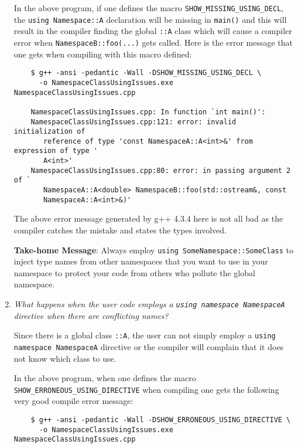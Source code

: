 \begin{enumerate}
In the above program, if one defines the macro
{}\texttt{SHOW\-\_MISSING\-\_USING\-\_DECL}, the {}\texttt{using
Namespace::A} declaration will be missing in {}\texttt{main()} and
this will result in the compiler finding the global {}\texttt{::A}
class which will cause a compiler error when
{}\texttt{NamespaceB::foo(...)} gets called.  Here is the error
message that one gets when compiling with this macro defined:

{\small\begin{verbatim}
    $ g++ -ansi -pedantic -Wall -DSHOW_MISSING_USING_DECL \
      -o NamespaceClassUsingIssues.exe NamespaceClassUsingIssues.cpp 

    NamespaceClassUsingIssues.cpp: In function `int main()':
    NamespaceClassUsingIssues.cpp:121: error: invalid initialization of 
       reference of type 'const NamespaceA::A<int>&' from expression of type '
       A<int>'
    NamespaceClassUsingIssues.cpp:80: error: in passing argument 2 of `
       NamespaceA::A<double> NamespaceB::foo(std::ostream&, const 
       NamespaceA::A<int>&)'
\end{verbatim}}

The above error message generated by g++ 4.3.4 here is not all bad as
the compiler catches the mistake and states the types involved.

{}\textbf{Take-home Message}: Always employ {}\texttt{using
SomeNamespace::SomeClass} to inject type names from other namespaces that you
want to use in your namespace to protect your code from others who pollute the
global namespace.

{}\item\textit{What happens when the user code employs a {}\texttt{using
namespace NamespaceA} directive when there are conflicting names?}

Since there is a global class {}\texttt{::A}, the user can not simply employ a
{}\texttt{using namespace NamespaceA} directive or the compiler will complain
that it does not know which class to use.

In the above program, when one defines the macro
{}\texttt{SHOW\-\_ERRONEOUS\-\_USING\-\_DIRECTIVE} when compiling one
gets the following very good compile error message:

{\small\begin{verbatim}
    $ g++ -ansi -pedantic -Wall -DSHOW_ERRONEOUS_USING_DIRECTIVE \
      -o NamespaceClassUsingIssues.exe NamespaceClassUsingIssues.cpp 


\end{verbatim}}
\end{enumerate}
